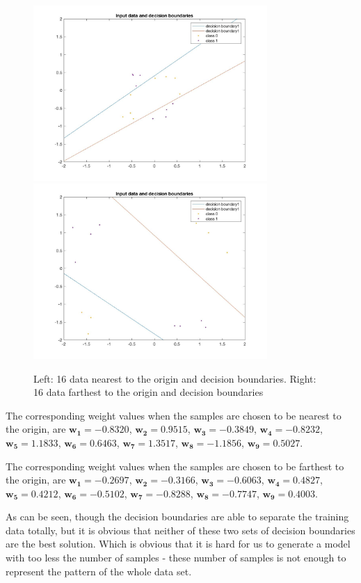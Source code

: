 \documentclass[a4paper]{article}
\begin{document}
\begin{spacing}{2.0}
\begin{itemize}
\begin{figure}[H]
\centering
\includegraphics[width = 3.5in]{inputDBonly16nearest.jpg}
\includegraphics[width = 3.5in]{inputDBonly16farthest.jpg}
\caption{Left: 16 data nearest to the origin and decision boundaries. Right: 16 data farthest to the origin and decision boundaries}
\label{inputDB_test16nearest}
\end{figure}

The corresponding weight values when the samples are chosen to be nearest to the origin, are $\mathbf{w_1 = -0.8320}$, $\mathbf{w_2 = 0.9515}$, $\mathbf{w_3 = -0.3849}$, $\mathbf{w_4 = -0.8232}$, $\mathbf{w_5 = 1.1833}$, $\mathbf{w_6 = 0.6463}$, $\mathbf{w_7 = 1.3517}$, $\mathbf{w_8 = -1.1856}$, $\mathbf{w_9 = 0.5027}$.

The corresponding weight values when the samples are chosen to be farthest to the origin, are $\mathbf{w_1 = -0.2697}$, $\mathbf{w_2 = -0.3166}$, $\mathbf{w_3 = -0.6063}$, $\mathbf{w_4 = 0.4827}$, $\mathbf{w_5 = 0.4212}$, $\mathbf{w_6 = -0.5102}$, $\mathbf{w_7 = -0.8288}$, $\mathbf{w_8 = -0.7747}$, $\mathbf{w_9 = 0.4003}$.

As can be seen, though the decision boundaries are able to separate the training data totally, but it is obvious that neither of these two sets of decision boundaries are the best solution. Which is obvious that it is hard for us to generate a model with too less the number of samples - these number of samples is not enough to represent the pattern of the whole data set.


\end{itemize}
\end{spacing}
\end{document}
